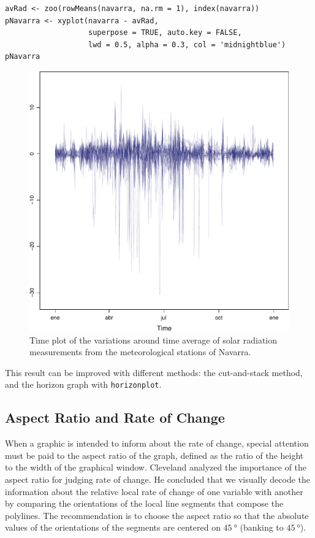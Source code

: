 \documentclass[smallroyalvopaper]{memoir}
\begin{document}

\lstset{language=r,label= ,caption= ,captionpos=b,numbers=none}
\begin{lstlisting}
avRad <- zoo(rowMeans(navarra, na.rm = 1), index(navarra))
pNavarra <- xyplot(navarra - avRad,
                   superpose = TRUE, auto.key = FALSE,
                   lwd = 0.5, alpha = 0.3, col = 'midnightblue') 
pNavarra
\end{lstlisting}

\begin{figure}[htbp]
\centering
\includegraphics[width=.9\linewidth]{figs/navarra.pdf}
\caption{Time plot of the variations around time average of solar radiation measurements from the meteorological stations of Navarra. \label{fig:navarraNaive}}
\end{figure}

This result can be improved with different methods: the cut-and-stack
method, and the horizon graph with \texttt{horizonplot}.

\subsection{Aspect Ratio and Rate of Change}
\label{sec:org361fb83}
When a graphic is intended to inform about the rate of change,
special attention must be paid to the aspect ratio of the graph,
defined as the ratio of the height to the width of the graphical
window. Cleveland analyzed the importance of the aspect ratio for
judging rate of change. He concluded that we visually decode the
information about the relative local rate of change of one
variable with another by comparing the orientations of the local
line segments that compose the polylines. The recommendation is to
choose the aspect ratio so that the absolute values of the
orientations of the segments are centered on \(\SI{45}{\degree}\) (banking
to \(\SI{45}{\degree}\)). 
\end{document}
